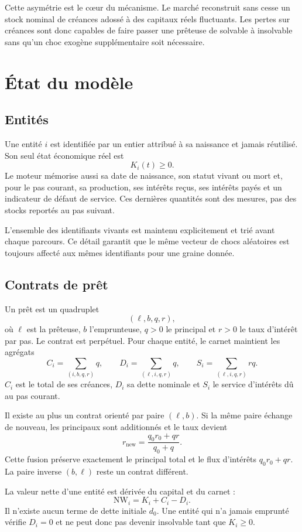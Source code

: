 \documentclass[11pt,a4paper]{article}
\newcommand{\NW}{\mathrm{NW}}
\begin{document}
Cette asymétrie est le cœur du mécanisme. Le marché reconstruit sans cesse un
stock nominal de créances adossé à des capitaux réels fluctuants. Les pertes
sur créances sont donc capables de faire passer une prêteuse de solvable à
insolvable sans qu'un choc exogène supplémentaire soit nécessaire.

\section{État du modèle}

\subsection{Entités}

Une entité $i$ est identifiée par un entier attribué à sa naissance et jamais
réutilisé. Son seul état économique réel est
\[
K_i(t)\geq 0.
\]
Le moteur mémorise aussi sa date de naissance, son statut vivant ou mort et,
pour le pas courant, sa production, ses intérêts reçus, ses intérêts payés et
un indicateur de défaut de service. Ces dernières quantités sont des mesures,
pas des stocks reportés au pas suivant.

L'ensemble des identifiants vivants est maintenu explicitement et trié avant
chaque parcours. Ce détail garantit que le même vecteur de chocs aléatoires
est toujours affecté aux mêmes identifiants pour une graine donnée.

\subsection{Contrats de prêt}

Un prêt est un quadruplet
\[
(\ell,b,q,r),
\]
où $\ell$ est la prêteuse, $b$ l'emprunteuse, $q>0$ le principal et $r>0$
le taux d'intérêt par pas. Le contrat est perpétuel. Pour chaque entité, le
carnet maintient les agrégats
\[
C_i=\sum_{(i,b,q,r)}q,
\qquad
D_i=\sum_{(\ell,i,q,r)}q,
\qquad
S_i=\sum_{(\ell,i,q,r)}rq.
\]
$C_i$ est le total de ses créances, $D_i$ sa dette nominale et $S_i$ le
service d'intérêts dû au pas courant.

Il existe au plus un contrat orienté par paire $(\ell,b)$. Si la même paire
échange de nouveau, les principaux sont additionnés et le taux devient
\[
r_{\mathrm{new}}
=\frac{q_0r_0+qr}{q_0+q}.
\]
Cette fusion préserve exactement le principal total et le flux d'intérêts
$q_0r_0+qr$. La paire inverse $(b,\ell)$ reste un contrat différent.

La valeur nette d'une entité est dérivée du capital et du carnet :
\[
\boxed{\NW_i=K_i+C_i-D_i.}
\]
Il n'existe aucun terme de dette initiale $d_0$. Une entité qui n'a jamais
emprunté vérifie $D_i=0$ et ne peut donc pas devenir insolvable tant que
$K_i\geq0$.
\end{document}
